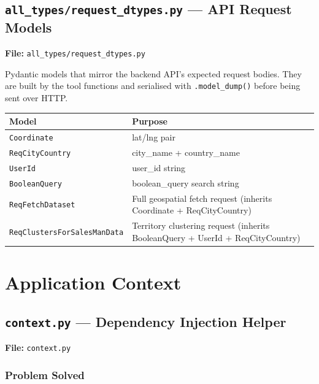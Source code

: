 \documentclass[12pt,a4paper]{report}
\begin{document}
\section{\texttt{all\_types/request\_dtypes.py} --- API Request Models}

\begin{mdframed}[style=filebox]
\textbf{File:} \texttt{all\_types/request\_dtypes.py}
\end{mdframed}

Pydantic models that mirror the backend API's expected request bodies.
They are built by the tool functions and serialised with \texttt{.model\_dump()}
before being sent over HTTP.

\begin{center}
\begin{tabularx}{\linewidth}{lX}
  \toprule
  \textbf{Model} & \textbf{Purpose} \\
  \midrule
  \texttt{Coordinate} & lat/lng pair \\
  \texttt{ReqCityCountry} & city\_name + country\_name \\
  \texttt{UserId} & user\_id string \\
  \texttt{BooleanQuery} & boolean\_query search string \\
  \texttt{ReqFetchDataset} & Full geospatial fetch request (inherits Coordinate + ReqCityCountry) \\
  \texttt{ReqClustersForSalesManData} & Territory clustering request (inherits BooleanQuery + UserId + ReqCityCountry) \\
  \bottomrule
\end{tabularx}
\end{center}

\chapter{Application Context}

\section{\texttt{context.py} --- Dependency Injection Helper}

\begin{mdframed}[style=filebox]
\textbf{File:} \texttt{context.py}
\end{mdframed}

\subsection{Problem Solved}
\end{document}
